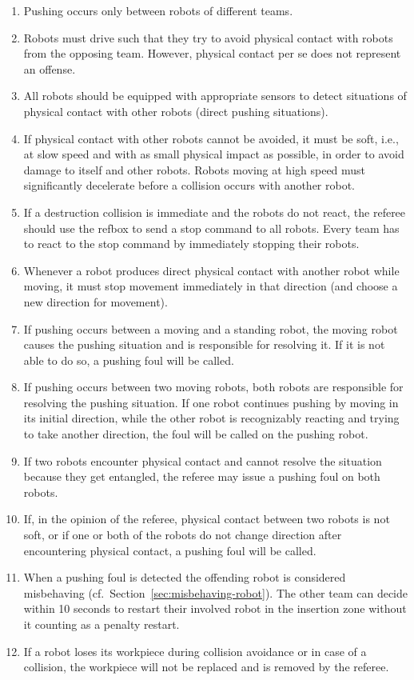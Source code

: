 \documentclass[12pt,twoside]{article}
\newcommand{\refsec}[1]{Section~\ref{#1}}
\begin{document}
\begin{enumerate}
\item Pushing occurs only between robots of different teams.
\item Robots must drive such that they try to avoid physical contact
  with robots from the opposing team. However, physical contact per se
  does not represent an offense.
\item All robots should be equipped with appropriate sensors to detect
  situations of physical contact with other robots (direct pushing
  situations).
\item If physical contact with other robots cannot be avoided, it must
  be soft, i.e., at slow speed and with as small physical impact as
  possible, in order to avoid damage to itself and other
  robots. Robots moving at high speed must significantly decelerate
  before a collision occurs with another robot.
\item If a destruction collision is immediate and the robots do not
  react, the referee should use the refbox to send a stop command to
  all robots. Every team has to react to the stop command by
  immediately stopping their robots.
\item Whenever a robot produces direct physical contact with another
  robot while moving, it must stop movement immediately in that
  direction (and choose a new direction for movement).
\item If pushing occurs between a moving and a standing robot, the
  moving robot causes the pushing situation and is responsible for
  resolving it. If it is not able to do so, a pushing foul will be
  called.
\item If pushing occurs between two moving robots, both robots are
  responsible for resolving the pushing situation. If one robot
  continues pushing by moving in its initial direction, while the
  other robot is recognizably reacting and trying to take another
  direction, the foul will be called on the pushing robot.
\item If two robots encounter physical contact and cannot resolve the
  situation because they get entangled, the referee may issue a
  pushing foul on both robots.
\item If, in the opinion of the referee, physical contact between two
  robots is not soft, or if one or both of the robots do not change
  direction after encountering physical contact, a pushing foul will
  be called.
\item When a pushing foul is detected the offending robot is considered
  misbehaving (cf.~\refsec{sec:misbehaving-robot}).
  The other team can decide within 10 seconds to restart their
  involved robot in the insertion zone without it counting as a
  penalty restart.
\item If a robot loses its workpiece during collision avoidance or in case of
  a collision, the workpiece will not be replaced and is removed by the referee.
\end{enumerate}
\end{document}
